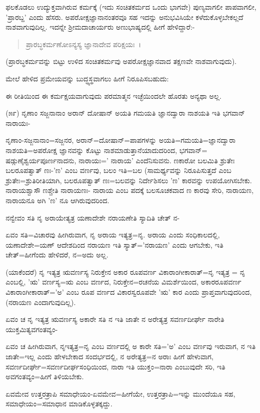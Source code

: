 ಫಲಕೊಡಲು ಉದ್ಯುಕ್ತವಾಗಿರುವ ಕರ್ಮಕ್ಕೆ (ಇದು ಸಂಚಿತಕರ್ಮದ ಒಂದು ಭಾಗವೇ) ಪುಣ್ಯವಾಗಲೀ ಪಾಪವಾಗಲೀ, 'ಪ್ರಾರಬ್ದ' ಎಂದು ಹೆಸರು. ಅಪರೋಕ್ಷಜ್ಞಾನಾನಂತರವೂ ಸಹ ಇದನ್ನು ಅನುಭವಿಸಿಯೇ ಕಳೆದುಕೊಳ್ಳಬೇಕಲ್ಲದೆ ನಾಶವಾಗುವುದಿಲ್ಲ. ಇದನ್ನೇ ಶ‍್ರೀಮದಾಚಾರ್ಯರು ಅಣುಭಾಷ್ಯದಲ್ಲಿ ಹೀಗೆ ಹೇಳಿದ್ದಾರೆ:-

\begin{verse}
ಪ್ರಾರಬ್ಧಕರ್ಮಣೋಽನ್ಯಸ್ಯ ಜ್ಞಾನಾದೇವ ಪರಿಕ್ಷಯಃ~।
\end{verse}

(ಪ್ರಾರಬ್ಧಕರ್ಮವನ್ನು ಬಿಟ್ಟು ಉಳಿದ ಸಂಚಿತಕರ್ಮವು ಅಪರೋಕ್ಷಜ್ಞಾನವಾದ ತಕ್ಷಣವೇ ನಾಶವಾಗುವುದು).

ಮೇಲೆ ಹೇಳಿದ ಪ್ರಮೇಯವನ್ನು ಬುದ್ಧ್ಯಸ್ಥವಾಗಲು ಹೀಗೆ ನಿರೂಪಿಸಬಹುದು:

ಈ ರೀತಿಯಿಂದ ಈ ಕರ್ಮಕ್ಷಯವಾಗುವುದು ಪರಮಾತ್ಮನ ಇಚ್ಛೆಯಿಂದಲೇ ಹೊರತು ಅನ್ಯಥಾ ಅಲ್ಲ.

(೫೯) ನೃಣಾಂ ಸಜ್ಜನಾನಾಂ ಅರಾನ್ ದೋಷಾನ್ ಅಯತಿ ಗಮಯತಿ ಜ್ಞಾನದ್ವಾರಾ ನಾಶಯತಿ ಇತಿ ಭಗವಾನ್ ನಾರಾಯಃ-

ನೃಣಾಂ-ಸಜ್ಜನಾನಾಂ=ಸಜ್ಜನರ, ಅರಾನ್=ದೋಷಾನ್=ಪಾಪಗಳನ್ನು ಅಯತಿ=ಗಮಯತಿ=ಜ್ಞಾನದ್ವಾರಾ ನಾಶಯತಿ=ಅಪರೋಕ್ಷ ಜ್ಞಾನವನ್ನು ಕೊಟ್ಟು ನಾಶಮಾಡುತ್ತಾನೆಯಾದುದರಿಂದ, ಭಗವಾನ್= ಷಡ್ಗುಣೈಶ್ವರ್ಯಪೂರ್ಣನಾದನು, ನಾರಾಯಃ=' ನಾರಾಯ' ಎಂದೆನಿಸುವನು. ಣಕಾರೋ ಬಲಮಿತಿ ಶ್ರುತೇಃ ಬಲರೂಪತ್ವಾತ್ ಣಃ-'ಣ' ಎಂಬ ವರ್ಣವು, ಬಲಂ ಇತಿ=ಬಲ (ಸಾಮರ್ಥ್ಯವನ್ನು ನಿರೂಪಿಸುತ್ತದೆ ಎಂಬ ಶ್ರುತೇಃ=ಶ್ರುತಿರೀತಿಯಾಗಿ, ಬಲರೂಪತ್ವಾತ್ ಣಃ=ಬಲವನ್ನು ನಿರ್ದೇಶಿಸಲು 'ಣ' ಕಾರವನ್ನು ಉಪಯೋಗಿಸಬೇಕು. ನಾರಾಯಶ್ವಾಸೌ ಣಶ್ಚೇತಿ ನಾರಾಯಣಃ- ನಾರಾಯ ಎಂಬ ಪದಕ್ಕೆ ಬಲಸೂಚಕವಾದ ಣ ಕಾರವು ಸೇರಿ, ನಾರಾಯಣ, ನಾರಾಯನೂ ಅಗಿ 'ಣ' ನೂ ಆಗಿರುವುದರಿಂದ.

ನನ್ವೇವಂ ಸತಿ ನೃ ಅರಾಯೇತ್ಯತ್ರ ಯಣಾದೇಶೇ ನರಾಯಣೇತಿ ಸ್ಯಾದಿತಿ ಚೇತ್ ನ-

ಏವಂ ಸತಿ=ವಿಚಾರವು ಹೀಗಿರುವಾಗ, ನೃ ಅರಾಯ ಇತ್ಯತ್ರ=ನೃ. ಅರಾಯ ಎಂದು ಸಂಧಿಕಾಲದಲ್ಲಿ, ಯಣಾದೇಶೇ=ಯಣ್ ಆದೇಶದಿಂದ ನರಾಯಣ ಇತಿ ಸ್ಯಾತ್='ನರಾಯಣ' ಎಂದು ಆಗಬೇಕು, ಇತಿ ಚೇತ್=ಹೀಗೆಂದು ಹೇಳಿದರೆ, ನ=ಅದು ಅಲ್ಲ.

(ಯಾಕೆಂದರೆ) ನೃ ಇತ್ಯತ್ರ ಋವರ್ಣಸ್ಯ ನಿರುಕ್ತೇನ ಅಕಾರ ರೂಪವರ್ಣ ವಿಕಾರಾಂಗೀಕಾರಾತ್=ನೃ ಇತ್ಯತ್ರ = ನೃ ಎಂಬಲ್ಲಿ, 'ಋ' ವರ್ಣಸ್ಯ=ಋ ಎಂಬ ವರ್ಣದ, ನಿರುಕ್ತೇನ=ರಚನೆಯ ವಿಮರ್ಶೆಯಿಂದ, ಅಕಾರರೂಪವರ್ಣ ವಿಕಾರಾಂಗೀಕಾರಾತ್='ಅ' ಎಂಬ ರೂಪ ವರ್ಣದ ವಿಕಾರಸ್ವರೂಪವೇ 'ಋ' ಕಾರ ಎಂದು ಪ್ರಾಪ್ತವಾಗುವುದರಿಂದ, (ನರಾಯಣ ಎಂದಾಗುವುದಿಲ್ಲ).

ಏವಂ ಚ ನೃ ಇತ್ಯತ್ರ ಋವರ್ಣಸ್ಯ ಅಕಾರೇ ಸತಿ ನ ಇತಿ ಜಾತೇ ನ ಅರೇತ್ಯತ್ರ ಸವರ್ಣದೀರ್ಘೇ ನಾರೇತಿ ಯುಕ್ತಮಿತ್ಯವಗಂತವ್ಯಂ-

ಏವಂ ಚ ಹೀಗಿರುವಾಗ, ನೃಇತ್ಯತ್ರ=ನೃ ಎಂಬ ವರ್ಣದಲ್ಲಿ ಅ ಕಾರೇ ಸತಿ='ಅ' ಎಂಬ ವರ್ಣವು ಇರುವಾಗ, ನ ಇತಿ ಜಾತೇ=ಇಲ್ಲ ಎಂದು ಹೇಳಬೇಕಾದ ಸಂದರ್ಭದಲ್ಲಿ, ನ ಅರೇತ್ಯತ್ರ=ನ ಅರಾಃ ಹೀಗೆ ಹೇಳುವಾಗ, ಸವರ್ಣದೀರ್ಘೇ=ಸವರ್ಣದೀರ್ಘಸಂಧಿಯಿಂದ, ನಾರಾ ಇತಿ ಯುಕ್ತಂ=ನಾರಾ ಎಂಬುವುದೇ ಸರಿ, ಇತಿ ಅವಗಂತವ್ಯಂ=ಹೀಗೆ ತಿಳಿಯಬೇಕು.

ಏವಮೇವ ಉತ್ತರತ್ರಾಪಿ ಸಮಾಧೇಯಂ-ಏವಮೇವ=ಹೀಗೆಯೇ, ಉತ್ತರತ್ರಾಪಿ=ಇನ್ನು ಮುಂದೆಯೂ ಸಹ, ಸಮಾಧೇಯಂ=ಸಮಾಧಾನ ಮಾಡಿಕೊಳ್ಳತಕ್ಕದ್ದು.

